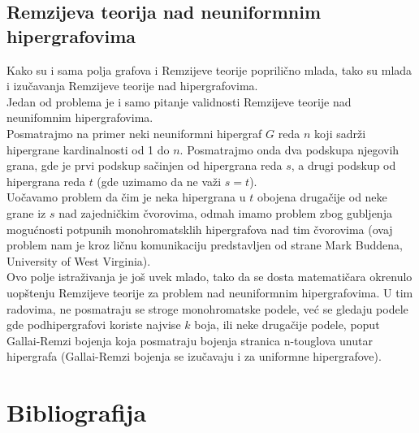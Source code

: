 \documentclass[a4paper]{article}
\begin{document}
	\subsection{Remzijeva teorija nad neuniformnim hipergrafovima}\label{neuniformni}
	
	Kako su i sama polja grafova i Remzijeve teorije poprilično mlada, tako su mlada i izučavanja Remzijeve teorije nad hipergrafovima. \\
	Jedan od problema je  i samo pitanje validnosti Remzijeve teorije nad neunifomnim hipergrafovima.\\
	Posmatrajmo na primer neki neuniformni hipergraf $G$ reda $n$ koji sadrži hipergrane kardinalnosti od 1 do $n$. Posmatrajmo onda dva podskupa njegovih grana, gde je prvi podskup sačinjen od  hipergrana reda $s$, a drugi podskup od hipergrana reda $t$ (gde uzimamo da ne važi $s=t$). \\ Uočavamo problem da čim je neka hipergrana u $t$ obojena drugačije od neke grane iz $s$ nad zajedničkim čvorovima, odmah imamo problem zbog gubljenja mogućnosti potpunih monohromatsklih hipergrafova nad tim čvorovima (ovaj problem nam je kroz ličnu komunikaciju predstavljen od strane Mark Buddena, University of West Virginia).  %
	\\Ovo polje istraživanja je još uvek mlado, tako da se dosta matematičara okrenulo uopštenju Remzijeve teorije za problem nad neuniformnim hipergrafovima. U tim radovima, ne posmatraju se stroge monohromatske podele, već se gledaju podele gde podhipergrafovi koriste najvise $k$ boja, ili neke drugačije podele, poput Gallai-Remzi bojenja koja posmatraju bojenja stranica n-touglova unutar hipergrafa (Gallai-Remzi bojenja se izučavaju i za uniformne hipergrafove).
	\pagebreak
	\section{Bibliografija}	
	\printbibliography
\end{document}
